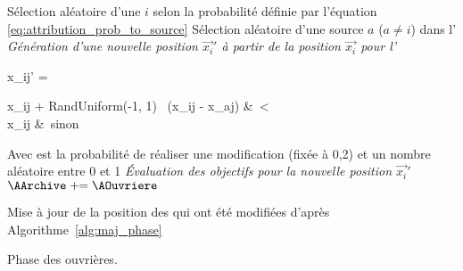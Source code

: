 \begin{algorithm}\label{alg:onlooker_phase}
  \SetAlgoVlined
  \DontPrintSemicolon
  \For{$\AOuvriere \in \AOnlookers$}
    {
      Sélection aléatoire d’une \ASource $i$ selon la probabilité
      définie par l’équation \eqref{eq:attribution_prob_to_source}\;
      Sélection aléatoire d’une source $a$ ($a \neq i$) dans l’\AArchive\;
       \emph{Génération d’une nouvelle position $\vec{x_{i}}'$ à partir de la
                         position $\vec{x_{i}}$ pour l’\AOuvriere }\;
      {
      \begin{algomathdisplay}
        x_{ij}' =%
          \begin{cases}
            x_{ij}  + RandUniform(-1, 1)   \times \ (x_{ij} - x_{aj}) &\ \ATirageB < \AMR \\
            x_{ij}                                                    &\ sinon
          \end{cases}
      \end{algomathdisplay}
      }
      \BlankLine
      Avec \AMR est la probabilité de réaliser une modification (fixée à 0,2) et
      \ATirageB un nombre aléatoire entre 0 et 1\;
      \BlankLine
       \emph{Évaluation des objectifs pour la nouvelle position $\vec{x_{i}}'$}\;
      \BlankLine
      {
        $\AArchive \pluseq \AOuvriere$ 
      }
    }

  Mise à jour de la position des \ASources qui ont été modifiées d’après Algorithme~\ref{alg:maj_phase}\;
  \caption{Phase des ouvrières.}
\end{algorithm}

